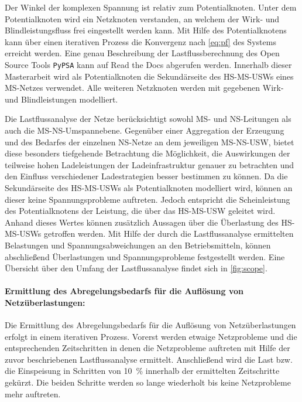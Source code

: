 Der Winkel der komplexen Spannung ist relativ zum Potentialknoten.
Unter dem Potentialknoten wird ein Netzknoten verstanden, an welchem der Wirk- und Blindleistungsfluss frei eingestellt werden kann.
Mit Hilfe des Potentialknotens kann über einen iterativen Prozess die Konvergenz nach \autoref{eq:pf} des Systems erreicht werden.
Eine genau Beschreibung der Lastflussberechnung des Open Source Tools \texttt{PyPSA} kann auf Read the Docs \cite{Brown2020a} abgerufen werden.
Innerhalb dieser Masterarbeit wird als Potentialknoten die Sekundärseite des \gls{HS}-\gls{MS}-\glspl{USW} eines \gls{MS}-Netzes verwendet.
Alle weiteren Netzknoten werden mit gegebenen Wirk- und Blindleistungen modelliert. \cite{Schachler}\medskip

Die Lastflussanalyse der Netze berücksichtigt sowohl \gls{MS}- und \gls{NS}-Leitungen als auch die \gls{MS}-\gls{NS}-Umspannebene.
Gegenüber einer Aggregation der Erzeugung und des Bedarfes der einzelnen \gls{NS}-Netze an dem jeweiligen \gls{MS}-\gls{NS}-\gls{USW}, bietet diese besonders tiefgehende Betrachtung die Möglichkeit, die Auswirkungen der teilweise hohen Ladeleistungen der Ladeinfrastruktur genauer zu betrachten und den Einfluss verschiedener Ladestrategien besser bestimmen zu können.
Da die Sekundärseite des \gls{HS}-\gls{MS}-\glspl{USW} als Potentialknoten modelliert wird, können an dieser keine Spannungsprobleme auftreten.
Jedoch entspricht die Scheinleistung des Potentialknotens der Leistung, die über das \gls{HS}-\gls{MS}-\gls{USW} geleitet wird.
Anhand dieses Wertes können zusätzlich Aussagen über die Überlastung des \gls{HS}-\gls{MS}-\glspl{USW} getroffen werden.
Mit Hilfe der durch die Lastflussanalyse ermittelten Belastungen und Spannungsabweichungen an den Betriebsmitteln, können abschließend Überlastungen und Spannungsprobleme festgestellt werden.
Eine Übersicht über den Umfang der Lastflussanalyse findet sich in \autoref{fig:scope}. \cite{Schachler}




\paragraph{Ermittlung des Abregelungsbedarfs für die Auflösung von Netzüberlastungen:}

Die Ermittlung des Abregelungsbedarfs für die Auflösung von Netzüberlastungen erfolgt in einem iterativen Prozess.
Vorerst werden etwaige Netzprobleme und die entsprechenden Zeitschritten in denen die Netzprobleme auftreten mit Hilfe der zuvor beschriebenen Lastflussanalyse ermittelt.
Anschließend wird die Last bzw. die Einspeisung in Schritten von \SI{10}{\percent} innerhalb der ermittelten Zeitschritte gekürzt.
Die beiden Schritte werden so lange wiederholt bis keine Netzprobleme mehr auftreten.\medskip

